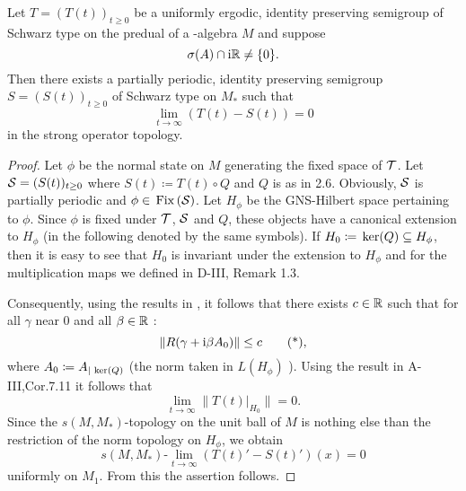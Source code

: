 \begin{theorem}\label{thm:d4-3.11}
Let $ T = (T(t))_{t \geq 0} $  be a uniformly ergodic, identity preserving semigroup of Schwarz type on the predual of a \WA-algebra $ M $  and suppose 
%
\[
	\sigma(A) \cap \mathrm{i}\mathbb{R} \neq \{0\} .
\]
%
Then there exists a partially periodic, identity preserving semigroup $ S = (S(t))_{t \geq 0} $  of Schwarz type on $ M_{*} $  such that
\[
\lim_{t \to \infty} (T(t) - S(t)) = 0
\]
in the strong operator topology.
\end{theorem}
\begin{proof}
Let $ \phi $  be the normal state on $ M $  generating the fixed space of $ \mathcal{T} $.
Let $ \mathcal{S} = (S(t))_{t \geq 0} $  where $ S(t) \coloneqq T(t) \circ Q $  and $ Q $  is as in 2.6.
Obviously, $ \mathcal{S} $  is partially periodic and $ \phi \in \mathop{}\mathrm{Fix}\left(\mathcal{S}\right) $.
Let $ H_{\phi} $  be the GNS-Hilbert space pertaining to $ \phi $.
Since $ \phi $  is fixed under $ \mathcal{T} $, $ \mathcal{S} $  and $ Q $,  these objects have a canonical extension to $ H_{\phi} $  (in the following denoted by the same symbols).
If $ H_{0} \coloneqq \mathop{}\mathrm{ker}(Q) \subseteq H_{\phi} $,  then it is easy to see that $ H_{0} $  is invariant under the extension to $ H_{\phi} $  and for the multiplication maps we defined in D-III, Remark 1.3.

Consequently, using the results in \citet{grohkuemmerer:1982}, it follows that there exists $ c \in \mathbb{R} $  such that for all $ \gamma $  near $ 0 $  and all $ \beta \in \mathbb{R} $ :
\begin{equation}
\|R(\gamma + \mathrm{i}\beta A_{0})\| \leq c \tag{*} ,
\end{equation}
where $ A_{0} \coloneqq A_{|\mathop{}\mathrm{ker}(Q)} $  (the norm taken in $ L(H_{\phi}) $ ).
Using the result in A-III,Cor.7.11 it follows that
\[
\lim_{t \to \infty} \|T(t)|_{H_{0}}\| = 0.
\]
Since the $ s(M,M_{*}) $-topology on the unit ball of $ M $  is nothing else than the restriction of the norm topology on $ H_{\phi} $, we obtain
\[
s(M,M_{*})\text{-}\lim_{t \to \infty} (T(t)' - S(t)')(x) = 0
\]
uniformly on $ M_{1} $.
From this the assertion follows.
\end{proof}
